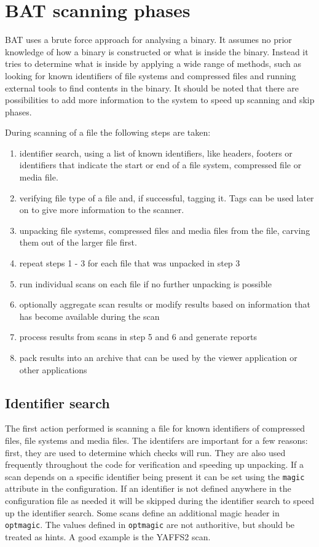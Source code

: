 \documentclass[10pt,a4paper]{article}
\begin{document}
\appendix

\section{BAT scanning phases}

BAT uses a brute force approach for analysing a binary. It assumes no prior
knowledge of how a binary is constructed or what is inside the binary. Instead
it tries to determine what is inside by applying a wide range of methods, such
as looking for known identifiers of file systems and compressed files and
running external tools to find contents in the binary. It should be noted that
there are possibilities to add more information to the system to speed up
scanning and skip phases.

During scanning of a file the following steps are taken:

\begin{enumerate}
\item identifier search, using a list of known identifiers, like headers,
footers or identifiers that indicate the start or end of a file system,
compressed file or media file.
\item verifying file type of a file and, if successful, tagging it. Tags can
be used later on to give more information to the scanner.
\item unpacking file systems, compressed files and media files from the file,
carving them out of the larger file first.
\item repeat steps 1 - 3 for each file that was unpacked in step 3
\item run individual scans on each file if no further unpacking is possible
\item optionally aggregate scan results or modify results based on information
that has become available during the scan
\item process results from scans in step 5 and 6 and generate reports
\item pack results into an archive that can be used by the viewer application
or other applications
\end{enumerate}

\subsection{Identifier search}

The first action performed is scanning a file for known identifiers of
compressed files, file systems and media files. The identifers are important
for a few reasons: first, they are used to determine which checks will run. They
are also used frequently throughout the code for verification and speeding up
unpacking. If a scan depends on a specific identifier being present it can be
set using the \texttt{magic} attribute in the configuration. If an identifier
is not defined anywhere in the configuration file as needed it will be skipped
during the identifier search to speed up the identifier search. Some scans
define an additional magic header in \texttt{optmagic}. The values defined in
\texttt{optmagic} are not authoritive, but should be treated as hints. A good
example is the YAFFS2 scan.
\end{document}
